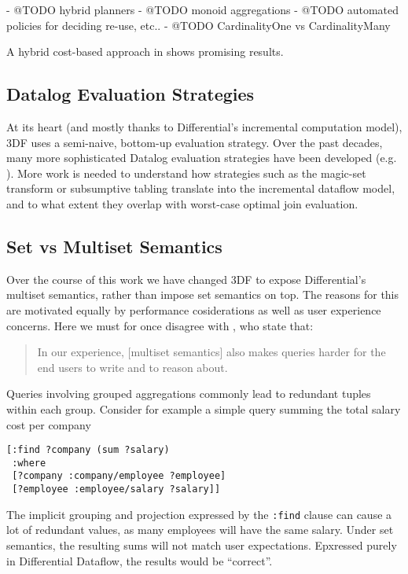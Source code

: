 \documentclass[../index.tex]{subfiles}
\begin{document}
- @TODO hybrid planners
- @TODO monoid aggregations
- @TODO automated policies for deciding re-use, etc..
- @TODO CardinalityOne vs CardinalityMany

A hybrid cost-based approach in \cite{mhedhbi2019optimizing} shows
promising results.

\subsection{Datalog Evaluation Strategies}

At its heart (and mostly thanks to Differential's incremental
computation model), 3DF uses a semi-naive, bottom-up evaluation
strategy. Over the past decades, many more sophisticated Datalog
evaluation strategies have been developed
(e.g. \cite{tekle2011more}). More work is needed to understand how
strategies such as the magic-set transform or subsumptive tabling
translate into the incremental dataflow model, and to what extent they
overlap with worst-case optimal join evaluation.

\subsection{Set vs Multiset Semantics}

Over the course of this work we have changed 3DF to expose
Differential's multiset semantics, rather than impose set semantics on
top. The reasons for this are motivated equally by performance
cosiderations as well as user experience concerns. Here we must for
once disagree with \cite{aref2015design}, who state that:

\begin{quote}
  In our experience, [multiset semantics] also makes queries harder
  for the end users to write and to reason about.
\end{quote}

Queries involving grouped aggregations commonly lead to redundant
tuples within each group. Consider for example a simple query summing
the total salary cost per company 

\begin{verbatim}
[:find ?company (sum ?salary)
 :where
 [?company :company/employee ?employee]
 [?employee :employee/salary ?salary]]
\end{verbatim}

The implicit grouping and projection expressed by the \texttt{:find}
clause can cause a lot of redundant values, as many employees will
have the same salary. Under set semantics, the resulting sums will not
match user expectations. Epxressed purely in Differential Dataflow,
the results would be ``correct''.
\end{document}
